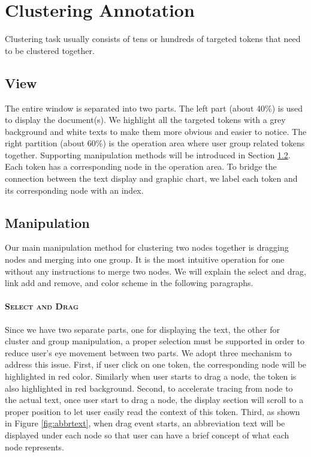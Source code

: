 \section{Clustering Annotation}

Clustering task usually consists of tens or hundreds of targeted tokens that need to be clustered together. 

\subsection{View}

The entire window is separated into two parts. The left part (about 40\%) is used to display the document(s). We highlight all the targeted tokens with a grey background and white texts to make them more obvious and easier to notice. The right partition (about 60\%) is the operation area where user group related tokens together. Supporting manipulation methods will be introduced in Section \ref{sec:manipulation}. Each token has a corresponding node in the operation area. To bridge the connection between the text display and graphic chart, we label each token and its corresponding node with an index.

\subsection{Manipulation}
\label{sec:manipulation}
Our main manipulation method for clustering two nodes together is dragging nodes and merging into one group. It is the most intuitive operation for one without any instructions to merge two nodes. We will explain the select and drag, link add and remove, and color scheme in the following paragraphs.

\paragraph{\textsc{Select and Drag}\\}
Since we have two separate parts, one for displaying the text, the other for cluster and group manipulation, a proper selection must be supported in order to reduce user's eye movement between two parts. We adopt three mechanism to address this issue. First, if user click on one token, the corresponding node will be highlighted in red color. Similarly when user starts to drag a node, the token is also highlighted in red background. Second, to accelerate tracing from node to the actual text, once user start to drag a node, the display section will scroll to a proper position to let user easily read the context of this token. Third, as shown in Figure \ref{fig:abbrtext}, when drag event starts, an abbreviation text will be displayed under each node so that user can have a brief concept of what each node represents.

